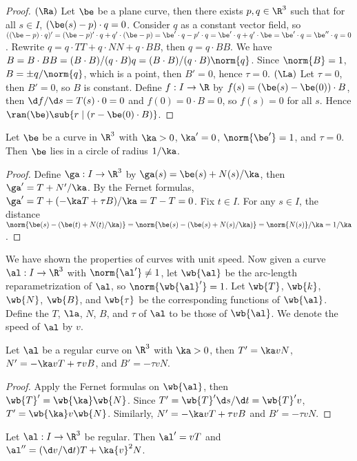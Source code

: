 \documentclass[10pt]{article}
\begin{document}
\begin{proof}
    $(\Ra)$ Let $\be$ be a plane curve, then there exists $p,q\in{\R}^{3}$ such that for all $s\in I$, $(\be(s)-p)\cdot q=0$. Consider $q$ as a constant vector field, so $((\be-p)\cdot q)'=(\be-p)'\cdot q+q'\cdot(\be-p)=\be'\cdot q-p'\cdot q=\be'\cdot q+q'\cdot\be=\be'\cdot q=\be''\cdot q=0$. Rewrite $q=q\cdot TT+q\cdot NN+q\cdot BB$, then $q=q\cdot BB$. We have $B=B\cdot BB=(B\cdot B)/(q\cdot B)q=(B\cdot B)/(q\cdot B)\norm{q}$. Since $\norm{B}=1$, $B=\pm q/\norm{q}$, which is a point, then $B'=0$, hence $\tau=0$. $(\La)$ Let $\tau=0$, then $B'=0$, so $B$ is constant. Define $f:I\to\R$ by $f(s)=(\be(s)-\be(0))\cdot B$, then $\d f/\d s=T(s)\cdot 0=0$ and $f(0)=0\cdot B=0$, so $f(s)=0$ for all $s$. Hence $\ran(\be)\sub\{r\mid(r-\be(0)\cdot B)\}$.
\end{proof}
\begin{proposition}
    Let $\be$ be a curve in ${\R}^{3}$ with $\ka>0$, $\ka'=0$, $\norm{\be'}=1$, and $\tau=0$. Then $\be$ lies in a circle of radius $1/\ka$.
\end{proposition}
\begin{proof}
    Define $\ga:I\to{\R}^{3}$ by $\ga(s)=\be(s)+N(s)/\ka$, then $\ga'=T+N'/\ka$. By the Fernet formulas, $\ga'=T+(-\ka T+\tau B)/\ka=T-T=0$. Fix $t\in I$. For any $s\in I$, the distance $\norm{\be(s)-(\be(t)+N(t)/\ka)}=\norm{\be(s)-(\be(s)+N(s)/\ka)}=\norm{N(s)}/\ka=1/\ka$.
\end{proof}
\par
We have shown the properties of curves with unit speed. Now given a curve $\al:I\to{\R}^{3}$ with $\norm{\al'}\ne 1$, let $\wb{\al}$ be the arc-length reparametrization of $\al$, so $\norm{\wb{\al}'}=1$. Let $\wb{T}$, $\wb{k}$, $\wb{N}$, $\wb{B}$, and $\wb{\tau}$ be the corresponding functions of $\wb{\al}$. Define the $T$, $\la$, $N$, $B$, and $\tau$ of $\al$ to be those of $\wb{\al}$. We denote the speed of $\al$ by $v$.
\begin{theorem}
    Let $\al$ be a regular curve on ${\R}^{3}$ with $\ka>0$, then $T'=\ka vN$, $N'=-\ka vT+\tau vB$, and $B'=-\tau vN$.
\end{theorem}
\begin{proof}
    Apply the Fernet formulas on $\wb{\al}$, then $\wb{T}'=\wb{\ka}\wb{N}$. Since $T'=\wb{T}'\d s/\d t=\wb{T}'v$, $T'=\wb{\ka}v\wb{N}$. Similarly, $N'=-\ka vT+\tau vB$ and $B'=-\tau vN$.
\end{proof}
\begin{proposition}
    Let $\al:I\to{\R}^{3}$ be regular. Then $\al'=vT$ and $\al''=(\d v/\d t)T+\ka{v}^{2}N$.
\end{proposition}
\end{document}
